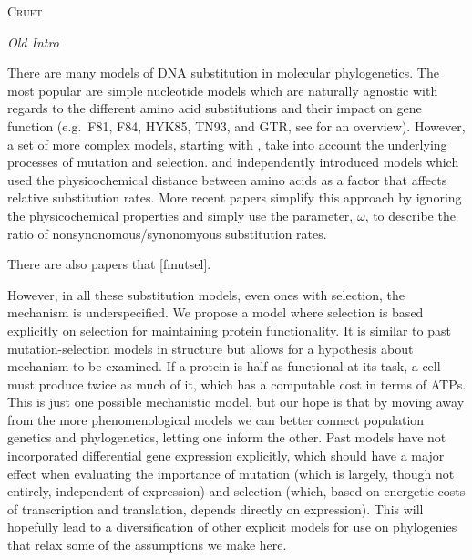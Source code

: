 \documentclass[12pt,letterpaper,fleqn]{article}
\renewcommand{\section}[1]{%
\bigskip
\begin{center}
\begin{Large}
\normalfont\scshape #1
\medskip
\end{Large}
\end{center}}
\renewcommand{\subsection}[1]{%
\bigskip
\begin{center}
\begin{large}
\normalfont\itshape #1
\end{large}
\end{center}}
\newcommand{\PC}{physicochemical\xspace}
\newcommand{\includeCruft}{0}%
\begin{document}
\ifthenelse{\includeCruft=1}
{


\pagebreak

\section{Cruft}
\subsection{Old Intro}
There are many models of DNA substitution in molecular phylogenetics.
The most popular are simple nucleotide models which are naturally agnostic with regards to the different amino acid substitutions and their impact on gene function (e.g.~F81, F84, HYK85, TN93, and GTR, see \citet{Yang2014} for an overview).
However, a set of more complex models, starting with \citep{GoldmanAndYang1994,MuseAndGaut1994}, take into account the underlying processes of mutation and selection.
\citet{GoldmanAndYang1994} and \citet{MuseAndGaut1994} independently introduced models which used the \PC distance between amino acids as a factor that affects relative substitution rates.
More recent papers simplify this approach by ignoring the \PC properties and simply use the parameter, $\omega$, to describe the ratio of nonsynonomous/synonomyous substitution rates.

There are also papers that [fmutsel].

However, in all these substitution models, even ones with selection, the mechanism is underspecified. We propose a model where selection is based explicitly on selection for maintaining protein functionality.
It is similar to past mutation-selection models in structure but allows for a hypothesis about mechanism to be examined. If a protein is half as functional at its task, a cell must produce twice as much of it, which has a computable cost in terms of ATPs.
This is just one possible mechanistic model, but our hope is that by moving away from the more phenomenological models we can better connect population genetics and phylogenetics, letting one inform the other.
Past models have not incorporated differential gene expression explicitly, which should have a major effect when evaluating the importance of mutation (which is largely, though not entirely, independent of expression) and selection (which, based on energetic costs of transcription and translation, depends directly on expression).
This will hopefully lead to a diversification of other explicit models for use on phylogenies that relax some of the assumptions we make here.

}
\end{document}
